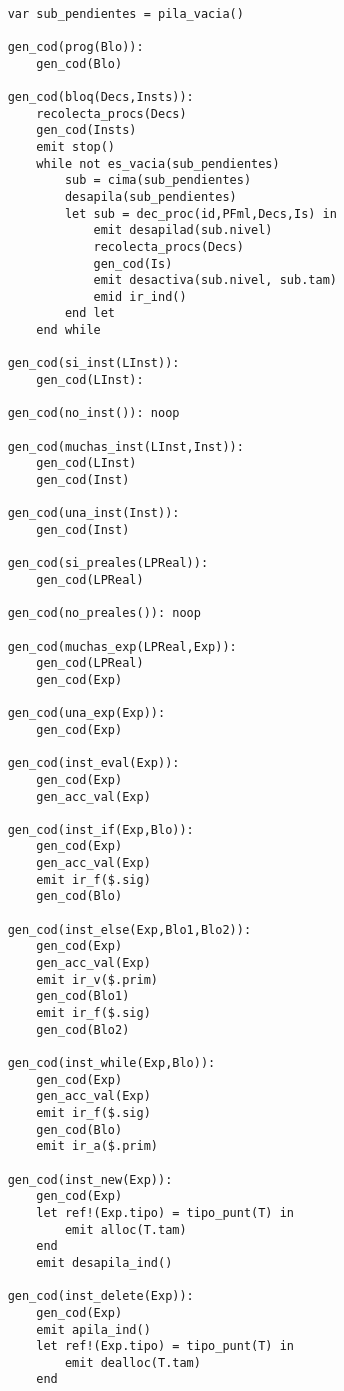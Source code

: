 
\begin{lstlisting}

    var sub_pendientes = pila_vacia()

    gen_cod(prog(Blo)):
        gen_cod(Blo)

    gen_cod(bloq(Decs,Insts)):
        recolecta_procs(Decs)
        gen_cod(Insts)
        emit stop()
        while not es_vacia(sub_pendientes)
            sub = cima(sub_pendientes)
            desapila(sub_pendientes)
            let sub = dec_proc(id,PFml,Decs,Is) in
                emit desapilad(sub.nivel)
                recolecta_procs(Decs)
                gen_cod(Is)
                emit desactiva(sub.nivel, sub.tam)
                emid ir_ind()
            end let
        end while

    gen_cod(si_inst(LInst)):
        gen_cod(LInst):

    gen_cod(no_inst()): noop

    gen_cod(muchas_inst(LInst,Inst)):
        gen_cod(LInst)
        gen_cod(Inst)

    gen_cod(una_inst(Inst)):
        gen_cod(Inst)

    gen_cod(si_preales(LPReal)):
        gen_cod(LPReal)

    gen_cod(no_preales()): noop

    gen_cod(muchas_exp(LPReal,Exp)):
        gen_cod(LPReal)
        gen_cod(Exp)

    gen_cod(una_exp(Exp)):
        gen_cod(Exp)

    gen_cod(inst_eval(Exp)):
        gen_cod(Exp)
        gen_acc_val(Exp)

    gen_cod(inst_if(Exp,Blo)):
        gen_cod(Exp)
        gen_acc_val(Exp)
        emit ir_f($.sig)
        gen_cod(Blo)

    gen_cod(inst_else(Exp,Blo1,Blo2)):
        gen_cod(Exp)
        gen_acc_val(Exp)
        emit ir_v($.prim)
        gen_cod(Blo1)
        emit ir_f($.sig)
        gen_cod(Blo2)

    gen_cod(inst_while(Exp,Blo)):
        gen_cod(Exp)
        gen_acc_val(Exp)
        emit ir_f($.sig)
        gen_cod(Blo)
        emit ir_a($.prim)

    gen_cod(inst_new(Exp)):
        gen_cod(Exp)
        let ref!(Exp.tipo) = tipo_punt(T) in
            emit alloc(T.tam)
        end
        emit desapila_ind()

    gen_cod(inst_delete(Exp)):
        gen_cod(Exp)
        emit apila_ind()
        let ref!(Exp.tipo) = tipo_punt(T) in
            emit dealloc(T.tam)
        end


\end{lstlisting}
